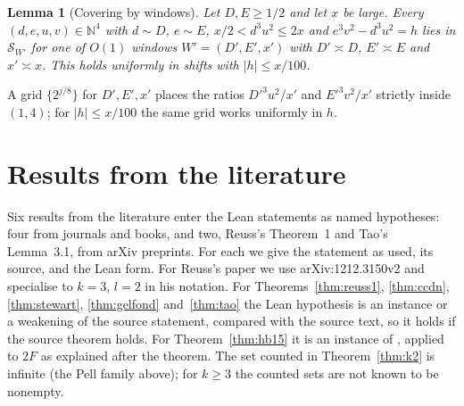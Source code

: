 \documentclass[11pt,reqno]{amsart}
\newtheorem{lemma}[theorem]{Lemma}
\theoremstyle{definition}
\theoremstyle{remark}
\numberwithin{equation}{section}
\newcommand{\N}{\mathbb N}
\begin{document}
\begin{lemma}[Covering by windows]\label{lem:windows}
Let $D,E\ge1/2$ and let $x$ be large. Every $(d,e,u,v)\in\N^4$ with
$d\sim D$, $e\sim E$, $x/2<d^3u^2\le 2x$ and $e^3v^2-d^3u^2=h$ lies in
$\mathcal S_{W'}$ for one of $O(1)$ windows $W'=(D',E',x')$ with
$D'\asymp D$, $E'\asymp E$ and $x'\asymp x$. This holds uniformly in shifts
with $|h|\le x/100$.
\end{lemma}
A grid $\{2^{j/8}\}$ for $D',E',x'$ places the ratios $D'^3u^2/x'$ and
$E'^3v^2/x'$ strictly inside $(1,4)$; for $|h|\le x/100$ the same grid works
uniformly in $h$.

\section{Results from the literature}\label{sec:cited}
Six results from the literature enter the Lean statements as named
hypotheses: four from journals and books, and two, Reuss's Theorem~1 and
Tao's Lemma~3.1, from arXiv preprints. For each
we give the statement as used, its source, and the Lean form. For Reuss's
paper we use arXiv:1212.3150v2 and specialise to $k=3$, $l=2$ in his notation.
For Theorems~\ref{thm:reuss1}, \ref{thm:ccdn}, \ref{thm:stewart},
\ref{thm:gelfond} and~\ref{thm:tao} the Lean hypothesis is an instance or a
weakening of the source statement, compared with the source text, so it
holds if the source theorem holds. For Theorem~\ref{thm:hb15} it is an instance of
\cite[Theorem~15]{HBLNM}, applied to $2F$ as explained after the theorem. The set counted in
Theorem~\ref{thm:k2} is infinite (the Pell family above); for $k\ge3$ the
counted sets are not known to be nonempty.
\end{document}
